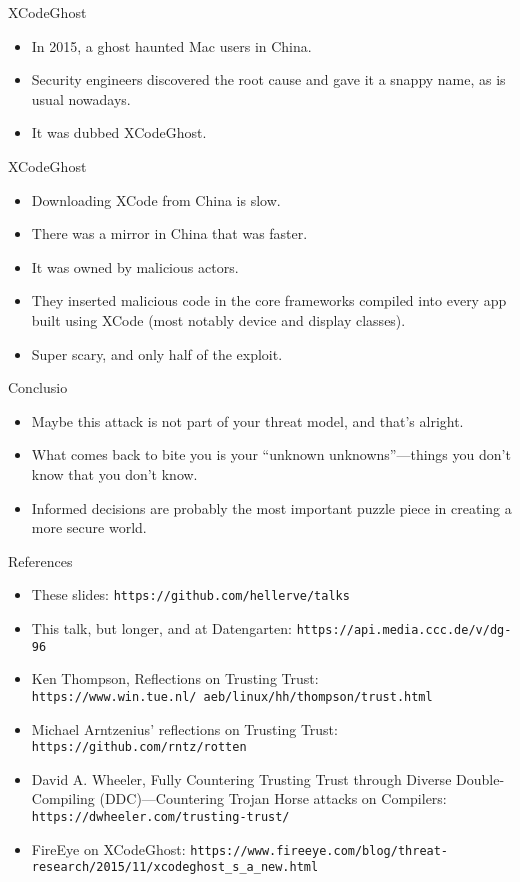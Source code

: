 \documentclass[aspectratio=169]{beamer}
\begin{document}
  \begin{frame}{XCodeGhost}
    \begin{itemize}
      \item In 2015, a ghost haunted Mac users in China.
      \item Security engineers discovered the root cause and gave it a snappy
            name, as is usual nowadays.
      \item It was dubbed XCodeGhost.
    \end{itemize}
  \end{frame}
  \begin{frame}{XCodeGhost}
    \begin{itemize}
      \item Downloading XCode from China is slow.
      \item There was a mirror in China that was faster.
      \item It was owned by malicious actors.
      \item They inserted malicious code in the core frameworks compiled into
            every app built using XCode (most notably device and display
            classes).
      \item Super scary, and only half of the exploit.
    \end{itemize}
  \end{frame}
  \begin{frame}{Conclusio}
    \begin{itemize}
      \item Maybe this attack is not part of your threat model, and that’s
            alright.
      \item What comes back to bite you is your “unknown unknowns”—things you
            don’t know that you don’t know.
      \item Informed decisions are probably the most important puzzle piece in
            creating a more secure world.
    \end{itemize}
  \end{frame}
  \begin{frame}{References}
    \begin{itemize}
      \item These slides: \texttt{https://github.com/hellerve/talks}
      \item This talk, but longer, and at Datengarten: \texttt{https://api.media.ccc.de/v/dg-96}
      \item Ken Thompson, Reflections on Trusting Trust: \texttt{https://www.win.tue.nl/~aeb/linux/hh/thompson/trust.html}
      \item Michael Arntzenius’ reflections on Trusting Trust: \texttt{https://github.com/rntz/rotten}
      \item David A. Wheeler, Fully Countering Trusting Trust through Diverse Double-Compiling (DDC)—Countering Trojan Horse attacks on Compilers: \texttt{https://dwheeler.com/trusting-trust/}
      \item FireEye on XCodeGhost: \texttt{https://www.fireeye.com/blog/threat-research/2015/11/xcodeghost\_s\_a\_new.html}
    \end{itemize}
  \end{frame}
\end{document}
